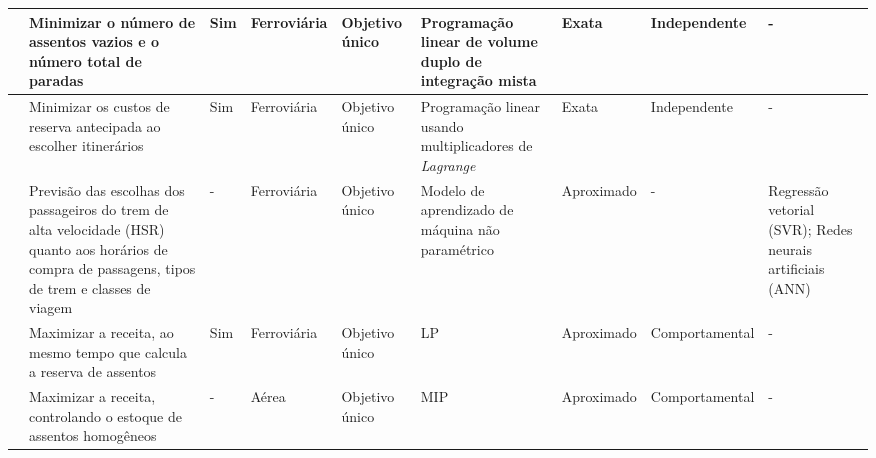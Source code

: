 \begin{center}
\begin{longtable}{|M{2cm}|M{3.3cm}|M{0.5cm}|M{1.1cm}|M{1cm}|M{1.7cm}|M{1.7cm}|M{1.7cm}|M{1.5cm}|}
		\citep{QI2018151}         &  Minimizar o número de assentos vazios e o número total de paradas                                                                                    & Sim                 & Ferroviária          &  Objetivo único          &  Programação linear de volume duplo de integração mista  & Exata                                           & Independente             & -                                                         \\ \hline
		\citep{XU201882}          &  Minimizar os custos de reserva antecipada ao escolher itinerários                                                                                    & Sim                 & Ferroviária          &  Objetivo único          &  Programação linear usando multiplicadores de \textit{Lagrange}   & Exata                                           & Independente             & -                                                         \\ \hline
		\citep{SUN201896}         &  Previsão das escolhas dos passageiros do trem de alta velocidade (HSR) quanto aos horários de compra de passagens, tipos de trem e classes de viagem & -                   & Ferroviária          &  Objetivo único          &  Modelo de aprendizado de máquina não paramétrico        & Aproximado                                      & -                        &  Regressão vetorial (SVR); Redes neurais artificiais (ANN) \\ \hline
		\citep{ZHAO2019776}       &  Maximizar a receita, ao mesmo tempo que calcula a reserva de assentos                                                                                & Sim                 & Ferroviária          &  Objetivo único          &  LP                                                      & Aproximado                                      & Comportamental           & -                                                         \\ \hline
		\citep{BARBIER20201002}   &  Maximizar a receita, controlando o estoque de assentos homogêneos                                                                                    & -                   & Aérea                &  Objetivo único          &  MIP                                                     & Aproximado                                      & Comportamental           & -                                                         \\ \hline

\end{longtable}
\end{center}
